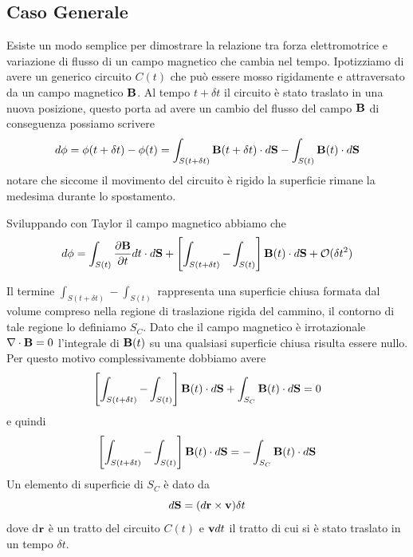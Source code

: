 \newpage

\subsection{Caso Generale }

Esiste un modo semplice per dimostrare la relazione tra forza elettromotrice e variazione di flusso di un campo magnetico che cambia nel tempo. Ipotizziamo di avere un generico circuito $C(t)$ che pu\`o essere mosso rigidamente e attraversato da un campo magnetico $\bold{B}$. Al tempo $t + \delta t$ il circuito \`e stato traslato in una nuova posizione, questo porta ad avere un cambio del flusso del campo $\bold{B}$ di conseguenza possiamo scrivere 
\begin{equation*}
	d \phi = \phi(t + \delta t) - \phi(t) = \int_{S(t+ \delta t)} \bold{B}(t+\delta t) \cdot d\bold{S} - \int_{S(t)} \bold{B}(t) \cdot d\bold{S}
\end{equation*}
notare che siccome il movimento del circuito \`e rigido la superficie rimane la medesima durante lo spostamento.

Sviluppando con Taylor il campo magnetico abbiamo che 
\begin{equation}
	d \phi = \int_{S(t)} \frac{\partial \bold{B}}{\partial t}dt \cdot d \bold{S} + \left[\int_{S(t+\delta t)} - \int _{S(t)}\right]\bold{B}(t) \cdot d\bold{S} + \mathcal{O}(\delta t^2)
\end{equation}

Il termine $\int_{S(t+ \delta t)} - \int_{S(t)}$ rappresenta una superficie chiusa  formata dal volume compreso nella regione di traslazione rigida del cammino, il contorno di tale regione lo definiamo $S_C$. Dato che il campo magnetico \`e  irrotazionale $\nabla \cdot \bold{B} = 0$ l'integrale di $\bold{B}(t)$ su una qualsiasi superficie chiusa risulta essere nullo. Per questo motivo complessivamente dobbiamo avere 
\begin{equation*}
	\left[\int_{S(t + \delta t)} - \int_{S(t)}\right] \bold{B}(t) \cdot d\bold{S} + \int_{S_C} \bold{B}(t) \cdot d \bold{S} = 0  
\end{equation*}
e quindi 
\begin{equation*}
\left[\int_{S(t + \delta t)} - \int_{S(t)}\right] \bold{B}(t) \cdot d\bold{S} = -\int_{S_C} \bold{B}(t) \cdot d \bold{S}  
\end{equation*}
Un elemento di superficie di $S_C$ \`e dato da 
\begin{equation*}
	d\bold{S} = (d\bold{r} \times \bold{v}) \delta t
\end{equation*} 
dove d$\bold{r}$ \`e un tratto del circuito $C(t)$ e $\bold{v}dt$ il tratto di cui si \`e stato traslato in un tempo $\delta t$.
\newpage

